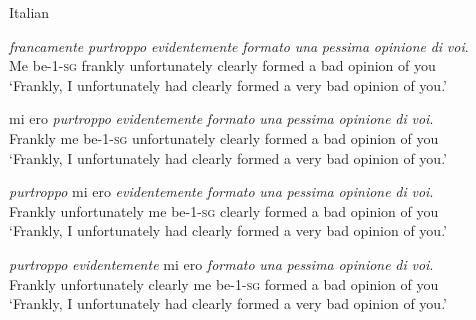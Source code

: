 \begin{exe} 
\ex Italian \citep[49]{cinque1999adverbs}\label{finiteauxcinque} \begin{xlist} 
\ex {} {\textit{francamente}} {\textit{purtroppo}} {\textit{evidentemente}} {\textit{formato}} {\textit{una}} {\textit{pessima}} {\textit{opinione}} {\textit{di}} {\textit{voi}.}  \\
{Me be-1-\textsc{sg}} {frankly} {unfortunately} {clearly} {formed} {a} {bad} {opinion} {of} {you} \\
\trans `Frankly, I unfortunately had clearly formed a very bad opinion of you.' \label{finiteauxcinquea}

\ex {} {mi ero} {\textit{purtroppo}} {\textit{evidentemente}} {\textit{formato}} {\textit{una}} {\textit{pessima}} {\textit{opinione}} {\textit{di}} {\textit{voi}.}  \\
 {Frankly} {me be-1-\textsc{sg}} {unfortunately} {clearly} {formed} {a} {bad} {opinion} {of} {you} \\
\trans `Frankly, I unfortunately had clearly formed a very bad opinion of you.' \label{finiteauxcinqueb}

\ex {}  {\textit{purtroppo}} {mi ero} {\textit{evidentemente}} {\textit{formato}} {\textit{una}} {\textit{pessima}} {\textit{opinione}} {\textit{di}} {\textit{voi}.}  \\
 {Frankly}  {unfortunately} {me be-1-\textsc{sg}} {clearly} {formed} {a} {bad} {opinion} {of} {you} \\
\trans `Frankly, I unfortunately had clearly formed a very bad opinion of you.' \label{finiteauxcinquec}

\ex {}  {\textit{purtroppo}}  {\textit{evidentemente}} {mi ero} {\textit{formato}} {\textit{una}} {\textit{pessima}} {\textit{opinione}} {\textit{di}} {\textit{voi}.}  \\
 {Frankly}  {unfortunately}  {clearly} {me be-1-\textsc{sg}} {formed} {a} {bad} {opinion} {of} {you} \\
\trans `Frankly, I unfortunately had clearly formed a very bad opinion of you.' \label{finiteauxcinquec}

\end{xlist} 
\end{exe}

